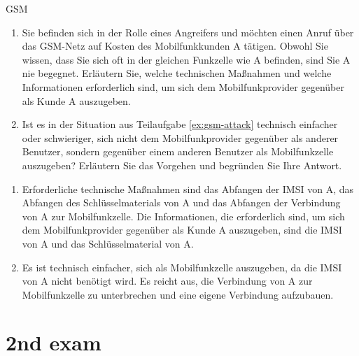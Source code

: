 \documentclass{article}
\begin{document}
\begin{exercise}{GSM}
  \begin{enumerate}
    \item\label{ex:gsm-attack} Sie befinden sich in der Rolle eines Angreifers und möchten einen Anruf über das GSM-Netz auf Kosten des Mobilfunkkunden A tätigen. Obwohl Sie wissen, dass Sie sich oft in der gleichen Funkzelle wie A befinden, sind Sie A nie begegnet. Erläutern Sie, welche technischen Maßnahmen und welche Informationen erforderlich sind, um sich dem Mobilfunkprovider gegenüber als Kunde A auszugeben.
    \item Ist es in der Situation aus Teilaufgabe \ref{ex:gsm-attack} technisch einfacher oder schwieriger, sich nicht dem Mobilfunkprovider gegenüber als anderer Benutzer, sondern gegenüber einem anderen Benutzer als Mobilfunkzelle auszugeben? Erläutern Sie das Vorgehen und begründen Sie Ihre Antwort.
  \end{enumerate}

  \begin{solution}
    \begin{enumerate}
        \item Erforderliche technische Maßnahmen sind das Abfangen der IMSI von A, das Abfangen des Schlüsselmaterials von A und das Abfangen der Verbindung von A zur Mobilfunkzelle. Die Informationen, die erforderlich sind, um sich dem Mobilfunkprovider gegenüber als Kunde A auszugeben, sind die IMSI von A und das Schlüsselmaterial von A.
        \item Es ist technisch einfacher, sich als Mobilfunkzelle auszugeben, da die IMSI von A nicht benötigt wird. Es reicht aus, die Verbindung von A zur Mobilfunkzelle zu unterbrechen und eine eigene Verbindung aufzubauen.
    \end{enumerate}
  \end{solution}
\end{exercise}



\setcounter{section}{2022}
\section{2nd exam}
\end{document}
